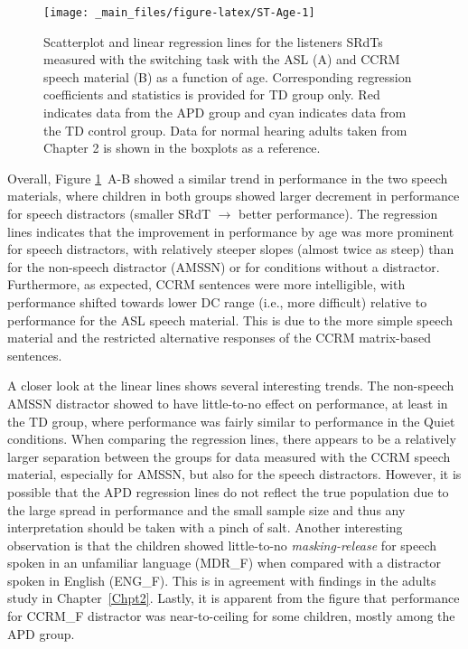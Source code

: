 \documentclass[a4paper, twoside]{templates/ociamthesis}
\begin{document}
\begin{figure}[h]

{\centering \texttt{[image: \_main\_files/figure-latex/ST-Age-1]} 

}

\caption{Scatterplot and linear regression lines for the listeners SRdTs measured with the switching task with the ASL (A) and CCRM speech material (B) as a function of age. Corresponding regression coefficients and statistics is provided for TD group only. Red indicates data from the APD group and cyan indicates data from the TD control group. Data for normal hearing adults taken from Chapter 2 is shown in the boxplots as a reference.}\label{fig:ST-Age}
\end{figure}

Overall, Figure \ref{fig:ST-Age}~A-B showed a similar trend in performance in the two speech materials, where children in both groups showed larger decrement in performance for speech distractors (smaller SRdT \(\rightarrow\) better performance). The regression lines indicates that the improvement in performance by age was more prominent for speech distractors, with relatively steeper slopes (almost twice as steep) than for the non-speech distractor (AMSSN) or for conditions without a distractor. Furthermore, as expected, CCRM sentences were more intelligible, with performance shifted towards lower DC range (i.e., more difficult) relative to performance for the ASL speech material. This is due to the more simple speech material and the restricted alternative responses of the CCRM matrix-based sentences.

A closer look at the linear lines shows several interesting trends. The non-speech AMSSN distractor showed to have little-to-no effect on performance, at least in the TD group, where performance was fairly similar to performance in the Quiet conditions. When comparing the regression lines, there appears to be a relatively larger separation between the groups for data measured with the CCRM speech material, especially for AMSSN, but also for the speech distractors. However, it is possible that the APD regression lines do not reflect the true population due to the large spread in performance and the small sample size and thus any interpretation should be taken with a pinch of salt. Another interesting observation is that the children showed little-to-no \emph{masking-release} for speech spoken in an unfamiliar language (MDR\_F) when compared with a distractor spoken in English (ENG\_F). This is in agreement with findings in the adults study in Chapter~\ref{Chpt2}. Lastly, it is apparent from the figure that performance for CCRM\_F distractor was near-to-ceiling for some children, mostly among the APD group.
\end{document}
